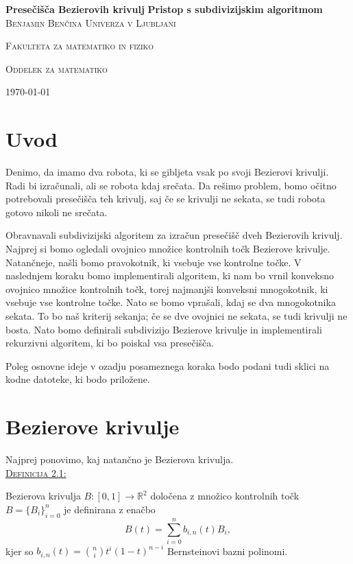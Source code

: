 \documentclass[a4paper, 12pt]{article} %
\newenvironment{matematika}[1]{
{\underline{\textsc{#1:}}}
}{
}
\begin{document}
\begin{titlepage}
\centering
\textbf{\Huge{Presečišča Bezierovih krivulj}}
\vfill
\textbf{\LARGE{Pristop s subdivizijskim algoritmom}}
\vfill\vfill
\textsc{\Large{Benjamin Benčina}}
\vfill\vfill
\textsc{\large{Univerza v Ljubljani}}

\textsc{\large{Fakulteta za matematiko in fiziko}}

\textsc{\large{Oddelek za matematiko}}
\vfill\vfill\vfill
	
{\large\today}

\end{titlepage}

\tableofcontents
\newpage

\section{Uvod}

Denimo, da imamo dva robota, ki se gibljeta vsak po svoji Bezierovi krivulji. Radi bi izračunali, ali se robota kdaj srečata. Da rešimo problem, bomo očitno potrebovali presečišča teh krivulj, saj če se krivulji ne sekata, se tudi robota gotovo nikoli ne srečata.

Obravnavali subdivizijski algoritem za izračun presečišč dveh Bezierovih krivulj. Najprej si bomo ogledali ovojnico množice kontrolnih točk Bezierove krivulje. Natančneje, našli bomo pravokotnik, ki vsebuje vse kontrolne točke. V naslednjem koraku bomo implementirali algoritem, ki nam bo vrnil konveksno ovojnico množice kontrolnih točk, torej najmanjši konveksni mnogokotnik, ki vsebuje vse kontrolne točke. Nato se bomo vprašali, kdaj se dva mnogokotnika sekata. To bo naš kriterij sekanja; če se dve ovojnici ne sekata, se tudi krivulji ne bosta. Nato bomo definirali subdivizijo Bezierove krivulje in implementirali rekurzivni algoritem, ki bo poiskal vsa presečišča.

Poleg osnovne ideje v ozadju posameznega koraka bodo podani tudi sklici na kodne datoteke, ki bodo priložene.

\section{Bezierove krivulje}

Najprej ponovimo, kaj natančno je Bezierova krivulja.\\
\begin{matematika}{Definicija 2.1}
Bezierova krivulja $B\colon [0, 1] \to \mathbb{R}^2$ določena z množico kontrolnih točk $B = \lbrace B_i \rbrace_{i = 0}^n$ je definirana z enačbo
\[ B(t) = \sum_{i = 0}^n b_{i,n}(t)B_i, \]
kjer so $b_{i,n}(t) = \binom{n}{i}t^{i}(1-t)^{n-i}$ Bernsteinovi bazni polinomi.
\end{matematika}
\end{document}
